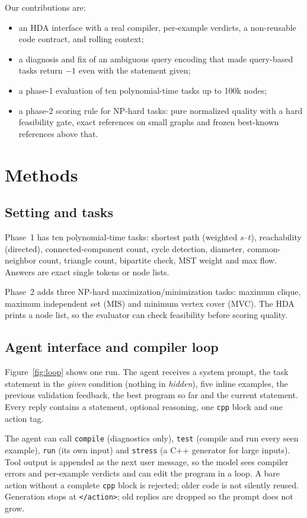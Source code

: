\documentclass[10pt]{article}
\begin{document}
Our contributions are:
\begin{itemize}\setlength\itemsep{1pt}
\item an HDA interface with a real compiler, per-example verdicts, a
  non-reusable code contract, and rolling context;
\item a diagnosis and fix of an ambiguous query encoding that made
  query-based tasks return $-1$ even with the statement given;
\item a phase-1 evaluation of ten polynomial-time tasks up to 100k nodes;
\item a phase-2 scoring rule for NP-hard tasks: pure normalized quality with
  a hard feasibility gate, exact references on small graphs and frozen
  best-known references above that.
\end{itemize}

\section{Methods}
\subsection{Setting and tasks}
Phase~1 has ten polynomial-time tasks: shortest path (weighted
$s$--$t$), reachability (directed), connected-component count, cycle detection,
diameter, common-neighbor count, triangle count, bipartite check, MST weight
and max flow. Answers are exact single tokens or node lists.

Phase~2 adds three NP-hard maximization/minimization tasks: maximum clique,
maximum independent set (MIS) and minimum vertex cover (MVC). The HDA prints a
node list, so the evaluator can check feasibility before scoring quality.

\subsection{Agent interface and compiler loop}
Figure~\ref{fig:loop} shows one run. The agent receives a system prompt, the
task statement in the \emph{given} condition (nothing in \emph{hidden}), five
inline examples, the previous validation feedback, the best program so far and
the current statement. Every reply contains a statement, optional reasoning,
one \texttt{cpp} block and one action tag.

The agent can call \texttt{compile} (diagnostics only), \texttt{test} (compile
and run every seen example), \texttt{run} (its own input) and \texttt{stress}
(a C++ generator for large inputs). Tool output is appended as the next user
message, so the model sees compiler errors and per-example verdicts and can
edit the program in a loop. A bare action without a complete \texttt{cpp} block
is rejected; older code is not silently reused. Generation stops at
\texttt{</action>}; old replies are dropped so the prompt does not grow.
\end{document}
